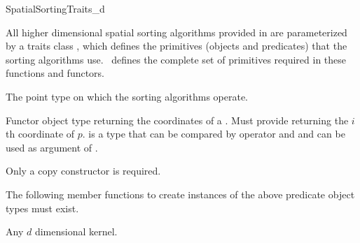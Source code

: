 

\begin{ccRefConcept}{SpatialSortingTraits_d}

\ccDefinition
  
All higher dimensional spatial sorting algorithms provided in \cgal{} are parameterized
by a traits class , which defines the
primitives (objects and predicates) that the sorting algorithms use.
\ccRefName\ defines the complete set of primitives required in these
functions and functors.

\ccTypes
\ccAutoIndexingOff
{}

%
       {The point type on which the sorting algorithms operate.
       }


%
       {Functor object type returning the coordinates of a  .
       Must provide 
          returning the $i$th
        coordinate of $p$.  is a type that can be compared by
        operator  \ccc{<} and \ccc{<=} and can be used as
        argument of .
       }

\ccCreation
{}  %

Only a copy constructor is required.


\ccOperations

The following member functions to create instances of the above predicate
object types must exist. 

\setlength\parskip{0mm}

\ccParDims
\ccHasModels

Any \cgal{} $d$ dimensional kernel.

\ccParDims
\end{ccRefConcept}


